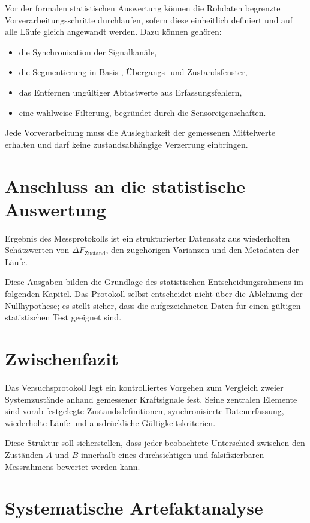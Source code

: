 \documentclass[12pt,a4paper]{report}
\begin{document}
Vor der formalen statistischen Auswertung können die Rohdaten begrenzte
Vorverarbeitungsschritte durchlaufen, sofern diese einheitlich definiert
und auf alle Läufe gleich angewandt werden. Dazu können gehören:

\begin{itemize}
\item die Synchronisation der Signalkanäle,
\item die Segmentierung in Basis-, Übergangs- und Zustandsfenster,
\item das Entfernen ungültiger Abtastwerte aus Erfassungsfehlern,
\item eine wahlweise Filterung, begründet durch die
      Sensoreigenschaften.
\end{itemize}

Jede Vorverarbeitung muss die Auslegbarkeit der gemessenen Mittelwerte
erhalten und darf keine zustandsabhängige Verzerrung einbringen.

\section{Anschluss an die statistische Auswertung}

Ergebnis des Messprotokolls ist ein strukturierter Datensatz aus
wiederholten Schätzwerten von $\Delta \bar{F}_{\text{Zustand}}$, den
zugehörigen Varianzen und den Metadaten der Läufe.

Diese Ausgaben bilden die Grundlage des statistischen
Entscheidungsrahmens im folgenden Kapitel. Das Protokoll selbst
entscheidet nicht über die Ablehnung der Nullhypothese; es stellt
sicher, dass die aufgezeichneten Daten für einen gültigen statistischen
Test geeignet sind.

\section{Zwischenfazit}

Das Versuchsprotokoll legt ein kontrolliertes Vorgehen zum Vergleich
zweier Systemzustände anhand gemessener Kraftsignale fest. Seine
zentralen Elemente sind vorab festgelegte Zustandsdefinitionen,
synchronisierte Datenerfassung, wiederholte Läufe und ausdrückliche
Gültigkeitskriterien.

Diese Struktur soll sicherstellen, dass jeder beobachtete Unterschied
zwischen den Zuständen $A$ und $B$ innerhalb eines durchsichtigen und
falsifizierbaren Messrahmens bewertet werden kann.

\section{Systematische Artefaktanalyse}
\end{document}
